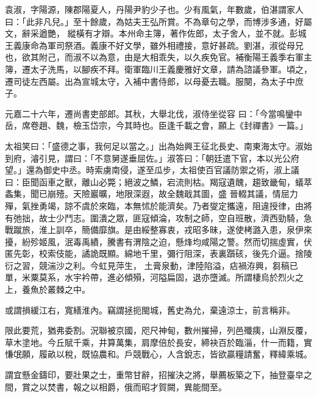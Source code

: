 
\begin{pinyinscope}

 袁淑，字陽源，陳郡陽夏人，丹陽尹豹少子也。少有風氣，年數歲，伯湛謂家人曰：「此非凡兒。」至十餘歲，為姑夫王弘所賞。不為章句之學，而博涉多通，好屬文，辭采遒艷，
 縱橫有才辯。本州命主簿，著作佐郎，太子舍人，並不就。彭城王義康命為軍司祭酒。義康不好文學，雖外相禮接，意好甚疏。劉湛，淑從母兄也，欲其附己，而淑不以為意，由是大相乖失，以久疾免官。補衡陽王義季右軍主簿，遷太子洗馬，以腳疾不拜。衛軍臨川王義慶雅好文章，請為諮議參軍。頃之，遷司徒左西屬。出為宣城太守，入補中書侍郎，以母憂去職。服闋，為太子中庶子。



 元嘉二十六年，遷尚書吏部郎。其秋，大舉北伐，淑侍坐從容
 曰：「今當鳴鑾中岳，席卷趙、魏，檢玉岱宗，今其時也。臣逢千載之會，願上《封禪書》一篇。」



 太祖笑曰：「盛德之事，我何足以當之。」出為始興王征北長史、南東海太守。淑始到府，濬引見，謂曰：「不意舅遂垂屈佐。」淑答曰：「朝廷遣下官，本以光公府望。」還為御史中丞。時索虜南侵，遂至瓜步，太祖使百官議防禦之術，淑上議曰：臣聞函車之獸，離山必斃；絕波之鱗，宕流則枯。羯寇遺醜，趨致畿甸，蟻萃螽集，聞已崩殪。天險巖曠，地限深遐，故全魏戢其圖，盛
 晉輟其議，情屈力殫，氣挫勇竭，諒不虞於來臨，本無怵於能濟矣。乃者燮定攜遠，阻違授律，由將有弛拙，故士少鬥志。圍潰之眾，匪寇傾淪，攻制之師，空自班散，濟西勁騎，急戰蹴旅，淮上訓卒，簡備靡旗。是由綏整寡衷，戎昭多昧，遂使栲潞入患，泉伊來擾，紛殄姬風，泯毒禹績，騰書有渭陰之迫，懸烽均咸陽之警。然而切揣虛實，伏匿先彰，校索伎能，譎詭既顯。綿地千里，彌行阻深，表裏躓硋，後先介逼。捨陵衍之習，競湍沙之利。今虹見萍生，
 土膏泉動，津陸陷溢，痁禍洊興，芻稿已單，米粟莫系，水宇衿帶，進必傾殞，河隘扁固，退亦墮滅。所謂棲烏於烈火之上，養魚於叢棘之中。



 或謂損緩江右，寬繕淮內。竊謂拯扼閩城，舊史為允，棄遠涼士，前言稱非。



 限此要荒，猶弗委割。況聯被京國，咫尺神甸，數州摧掃，列邑殲痍，山淵反覆，草木塗地。今丘賦千乘，井算萬集，肩摩倍於長安，締袂百於臨淄，什一而籍，實慊氓願，履畝以稅，既協農和。戶競戰心，人含銳志，皆欲贏糧請奮，釋緯乘城。



 謂宜懸金鑄印，要壯果之士，重幣甘辭，招摧決之將，舉薦板築之下，抽登臺皁之間，賞之以焚書，報之以相爵，俄而昭才賀闕，異能間至。




\end{pinyinscope}
